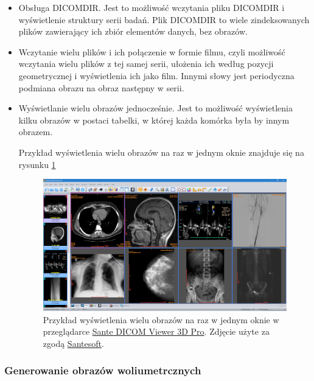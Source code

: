 \begin{itemize}

    \item Obsługa DICOMDIR.
          Jest to możliwość wczytania pliku DICOMDIR i wyświetlenie struktury serii badań.
          Plik DICOMDIR to wiele zindeksowanych plików zawierający ich zbiór elementów danych, bez obrazów.

    \item Wczytanie wielu plików i ich połączenie w formie filmu, czyli możliwość wczytania wielu plików z tej samej serii, ułożenia ich według pozycji geometrycznej i wyświetlenia ich jako film.
          Innymi słowy jest periodyczna podmiana obrazu na obraz następny w serii.

    \item Wyświetlanie wielu obrazów jednocześnie.
          Jest to możliwość wyświetlenia kilku obrazów w postaci tabelki, w której każda komórka była by innym obrazem.

          Przykład wyświetlenia wielu obrazów na raz w jednym oknie znajduje się na rysunku \ref{fig:dicomviewer001}

          \begin{figure}[!htbp]
              \centering
              \includegraphics[width=\textwidth]{img/dicom-viewer-001.png}
              \caption{Przykład wyświetlenia wielu obrazów na raz w jednym oknie w przeglądarce \href{https://www.santesoft.com/win/sante-dicom-viewer-3d-pro/sante-dicom-viewer-3d-pro.html}{Sante DICOM Viewer 3D Pro}. Zdjęcie użyte za zgodą \href{https://www.santesoft.com/}{Santesoft}.}
              \label{fig:dicomviewer001}
          \end{figure}
\end{itemize}

\subsubsection{Generowanie obrazów woliumetrcznych}

